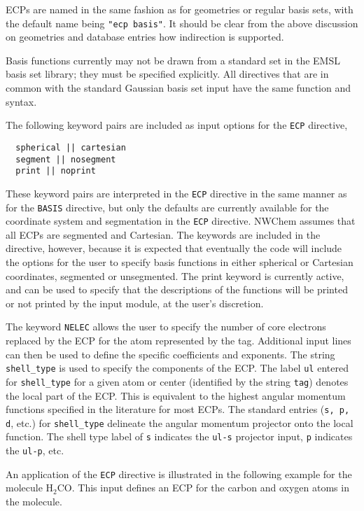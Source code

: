 ECPs are named in the same fashion as for geometries or regular basis
sets, with the default name being \verb+"ecp basis"+.  It should be
clear from the above discussion on geometries and database entries how
indirection is supported.

Basis functions currently may not be drawn from a standard set in the
EMSL basis set library; they must be specified explicitly.  All
directives that are in common with the standard Gaussian basis set
input have the same function and syntax.

The following keyword pairs are included as input options for the 
\verb+ECP+ directive,
\begin{verbatim}
  spherical || cartesian
  segment || nosegment
  print || noprint
\end{verbatim}

These keyword pairs are interpreted in the \verb+ECP+ directive in the
same manner as for the \verb+BASIS+ directive, but only the defaults
are currently available for the coordinate system and segmentation in
the \verb+ECP+ directive.  NWChem assumes that all ECPs are segmented
and Cartesian.  The keywords are included in the directive, however,
because it is expected that eventually the code will include the
options for the user to specify basis functions in either spherical or
Cartesian coordinates, segmented or unsegmented.  The print keyword is
currently active, and can be used to specify that the descriptions of
the functions will be printed or not printed by the input module, at
the user's discretion.

The keyword \verb+NELEC+ allows the user to specify the number of core
electrons replaced by the ECP for the atom represented by the tag.
Additional input lines can then be used to define the specific
coefficients and exponents.  The string \verb+shell_type+ is used to
specify the components of the ECP.  The label \verb+ul+ entered for
\verb+shell_type+ for a given atom or center (identified by the string
\verb+tag+) denotes the local part of the ECP.  This is equivalent to
the highest angular momentum functions specified in the literature for
most ECPs.  The standard entries (\verb+s, p, d+, etc.) for
\verb+shell_type+ delineate the angular momentum projector onto the
local function.  The shell type label of \verb+s+ indicates the
\verb+ul-s+ projector input, \verb+p+ indicates the \verb+ul-p+, etc.

An application of the \verb+ECP+ directive is illustrated in the
following example for the molecule H$_2$CO.  This input defines an ECP
for the carbon and oxygen atoms in the molecule.

